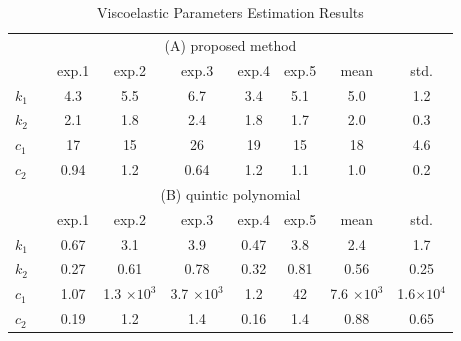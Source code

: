 \documentclass[a4paper]{jarticle}
\begin{document}
\begin{table}[htbp]
    \centering
    \caption{Viscoelastic Parameters Estimation Results}
    \setlength{\tabcolsep}{3pt} 
    \label{tab:double_subtables}
    \begin{tabular}{l|ccccc|c|c} 
                \multicolumn{8}{c}{(A) proposed method}\\
          　　 & exp.1 & exp.2 & exp.3 & exp.4 & exp.5 & mean & std. \\
          \hline
          $k_1$ & 4.3  & 5.5 & 6.7  & 3.4 & 5.1 & 5.0 & 1.2 \\
          $k_2$ & 2.1  & 1.8 & 2.4  & 1.8 & 1.7 & 2.0 & 0.3 \\
          $c_1$ & 17   & 15  & 26   & 19  & 15  & 18  & 4.6 \\
          $c_2$ & 0.94 & 1.2 & 0.64 & 1.2 & 1.1 & 1.0 & 0.2 \\
                \multicolumn{8}{c}{(B) quintic polynomial}\\
        　　 & exp.1 & exp.2 & exp.3 & exp.4 & exp.5 & mean & std. \\
        \hline
        $k_1$ & 0.67 & 3.1               & 3.9               & 0.47 & 3.8  & 2.4               & 1.7 \\
        $k_2$ & 0.27 & 0.61              & 0.78              & 0.32 & 0.81 & 0.56              & 0.25 \\
        $c_1$ & 1.07 & 1.3 $\times 10^3$ & 3.7 $\times 10^3$ & 1.2  & 42   & 7.6 $\times 10^3$ &  1.6$\times 10^4$ \\
        $c_2$ & 0.19 & 1.2               & 1.4               & 0.16 & 1.4  & 0.88              & 0.65 \\
    \end{tabular}

\end{table}
\end{document}
